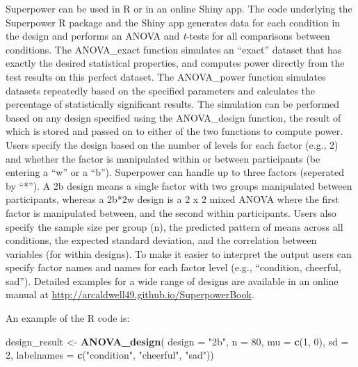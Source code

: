 \documentclass[,man,floatsintext]{apa6}
\newenvironment{Shaded}{\begin{snugshade}}{\end{snugshade}}
\newcommand{\DataTypeTok}[1]{\textcolor[rgb]{0.13,0.29,0.53}{#1}}
\newcommand{\DecValTok}[1]{\textcolor[rgb]{0.00,0.00,0.81}{#1}}
\newcommand{\KeywordTok}[1]{\textcolor[rgb]{0.13,0.29,0.53}{\textbf{#1}}}
\newcommand{\NormalTok}[1]{#1}
\newcommand{\StringTok}[1]{\textcolor[rgb]{0.31,0.60,0.02}{#1}}
\begin{document}
Superpower can be used in R or in an online Shiny app.
The code underlying the Superpower R package and the Shiny app generates data for each condition in the design and performs an ANOVA and \emph{t}-tests for all comparisons between conditions.
The ANOVA\_exact function simulates an \enquote{exact} dataset that has exactly the desired statistical properties, and computes power directly from the test results on this perfect dataset.
The ANOVA\_power function simulates datasets repeatedly based on the specified parameters and calculates the percentage of statistically significant results.
The simulation can be performed based on any design specified using the ANOVA\_design function, the result of which is stored and passed on to either of the two functions to compute power.
Users specify the design based on the number of levels for each factor (e.g., 2) and whether the factor is manipulated within or between participants (be entering a \enquote{w} or a \enquote{b}).
Superpower can handle up to three factors (seperated by \enquote{*}).
A 2b design means a single factor with two groups manipulated between participants, whereas a 2b*2w design is a 2 x 2 mixed ANOVA where the first factor is manipulated between, and the second within participants.
Users also specify the sample size per group (n), the predicted pattern of means across all conditions, the expected standard deviation, and the correlation between variables (for within designs).
To make it easier to interpret the output users can specify factor names and names for each factor level (e.g., \enquote{condition, cheerful, sad}).
Detailed examples for a wide range of designs are available in an online manual at \url{http://arcaldwell49.github.io/SuperpowerBook}.

An example of the R code is:

\begin{Shaded}
\begin{Highlighting}[]
\NormalTok{design_result <-}\StringTok{ }\KeywordTok{ANOVA_design}\NormalTok{(}
  \DataTypeTok{design =} \StringTok{"2b"}\NormalTok{, }
  \DataTypeTok{n =} \DecValTok{80}\NormalTok{,}
  \DataTypeTok{mu =} \KeywordTok{c}\NormalTok{(}\DecValTok{1}\NormalTok{, }\DecValTok{0}\NormalTok{), }
  \DataTypeTok{sd =} \DecValTok{2}\NormalTok{,}
  \DataTypeTok{labelnames =} \KeywordTok{c}\NormalTok{(}\StringTok{"condition"}\NormalTok{, }\StringTok{"cheerful"}\NormalTok{, }\StringTok{"sad"}\NormalTok{))}
\end{Highlighting}
\end{Shaded}
\end{document}
